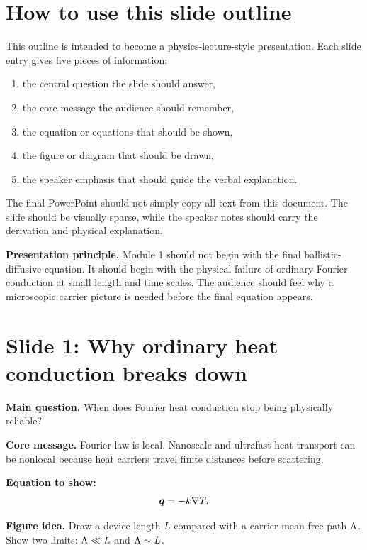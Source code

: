 \documentclass[11pt]{article}
\begin{document}
\section{How to use this slide outline}
This outline is intended to become a physics-lecture-style presentation. Each slide entry gives five pieces of information:
\begin{enumerate}[leftmargin=1.6em]
    \item the central question the slide should answer,
    \item the core message the audience should remember,
    \item the equation or equations that should be shown,
    \item the figure or diagram that should be drawn,
    \item the speaker emphasis that should guide the verbal explanation.
\end{enumerate}
The final PowerPoint should not simply copy all text from this document. The slide should be visually sparse, while the speaker notes should carry the derivation and physical explanation.

\begin{notebox}
\textbf{Presentation principle.} Module 1 should not begin with the final ballistic-diffusive equation. It should begin with the physical failure of ordinary Fourier conduction at small length and time scales. The audience should feel why a microscopic carrier picture is needed before the final equation appears.
\end{notebox}

\section{Slide 1: Why ordinary heat conduction breaks down}
\begin{physicsbox}
\textbf{Main question.} When does Fourier heat conduction stop being physically reliable?
\end{physicsbox}

\textbf{Core message.} Fourier law is local. Nanoscale and ultrafast heat transport can be nonlocal because heat carriers travel finite distances before scattering.

\textbf{Equation to show:}
\begin{equation*}
\bm{q}=-k\nabla T.
\end{equation*}

\textbf{Figure idea.} Draw a device length \(L\) compared with a carrier mean free path \(\Lambda\). Show two limits: \(\Lambda\ll L\) and \(\Lambda\sim L\).
\end{document}
